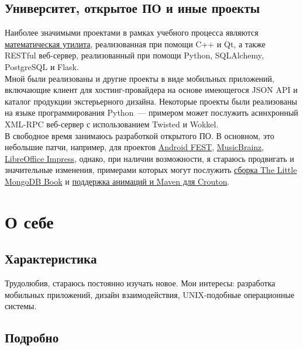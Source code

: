     \subsection*{Университет, открытое ПО и иные проекты}

      Наиболее значимыми проектами в рамках учебного процесса являются
      \href{https://github.com/ming13/aequatio}{математическая утилита},
      реализованная при помощи C++ и Qt, а также RESTful веб-сервер, реализованный
      при помощи Python, SQLAlchemy, PostgreSQL и Flask. \\

      Мной были реализованы и другие проекты в виде мобильных приложений,
      включающие клиент для хостинг-провайдера на основе имеющегося
      JSON API и каталог продукции экстерьерного дизайна.
      Некоторые проекты были реализованы на языке программирования Python~--- примером может послужить
      асинхронный XML-RPC веб-сервер с использованием Twisted и Wokkel. \\

      В свободное время занимаюсь разработкой открытого ПО. 
      В основном, это небольшие патчи, например, для проектов
      \href{https://github.com/square/fest-android/commits?author=ming13}{Android FEST},
      \href{https://github.com/jdamcd/musicbrainz-android/commits?author=ming13}{MusicBrainz},
      \href{https://gerrit.libreoffice.org/#/q/owner:%22Artur+Dryomov%22+status:closed,n,z}{LibreOffice Impress},
      однако, при наличии возможности, я стараюсь продвигать и значительные изменения, примерами
      которых могут послужить
      \href{https://github.com/karlseguin/the-little-mongodb-book/pull/16}{сборка The Little MongoDB Book} и
      \href{https://github.com/keyboardsurfer/Crouton/pulls/ming13?state=closed}{поддержка анимаций и Maven для Crouton}.


  \section*{О себе}

    \subsection*{Характеристика}

      Трудолюбив, стараюсь постоянно изучать новое.
      Мои интересы: разработка мобильных приложений, дизайн
      взаимодействия, UNIX-подобные операционные системы.

    \subsection*{Подробно}


